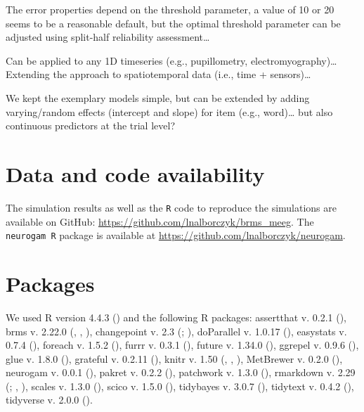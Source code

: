 \documentclass[
  doc,
  floatsintext,
  longtable,
  a4paper,
  nolmodern,
  notxfonts,
  notimes,
  colorlinks=true,linkcolor=blue,citecolor=blue,urlcolor=blue]{apa7}
\begin{document}
The error properties depend on the threshold parameter, a value of 10 or
20 seems to be a reasonable default, but the optimal threshold parameter
can be adjusted using split-half reliability assessment\ldots{}

Can be applied to any 1D timeseries (e.g., pupillometry,
electromyography)\ldots{} Extending the approach to spatiotemporal data
(i.e., time + sensors)\ldots{}

We kept the exemplary models simple, but can be extended by adding
varying/random effects (intercept and slope) for item (e.g.,
word)\ldots{} but also continuous predictors at the trial level?

\newpage

\section{Data and code availability}\label{data-and-code-availability}

The simulation results as well as the \texttt{R} code to reproduce the
simulations are available on GitHub:
\url{https://github.com/lnalborczyk/brms_meeg}. The \texttt{neurogam\ R}
package is available at \url{https://github.com/lnalborczyk/neurogam}.

\section{Packages}\label{packages}

We used R version 4.4.3 () and the
following R packages: assertthat v. 0.2.1
(), brms v. 2.22.0
(, ,
), changepoint v. 2.3
(;
), doParallel v.
1.0.17 (),
easystats v. 0.7.4 (),
foreach v. 1.5.2 (),
furrr v. 0.3.1 (), future
v. 1.34.0 (), ggrepel v.
0.9.6 (), glue v. 1.8.0
(), grateful v. 0.2.11
(), knitr v.
1.50 (,
, ),
MetBrewer v. 0.2.0 (), neurogam v.
0.0.1 (), pakret v. 0.2.2
(), patchwork v. 1.3.0
(), rmarkdown v. 2.29
(;
,
), scales v. 1.3.0
(), scico v. 1.5.0
(), tidybayes v.
3.0.7 (), tidytext v. 0.4.2
(), tidyverse v. 2.0.0
().
\end{document}
